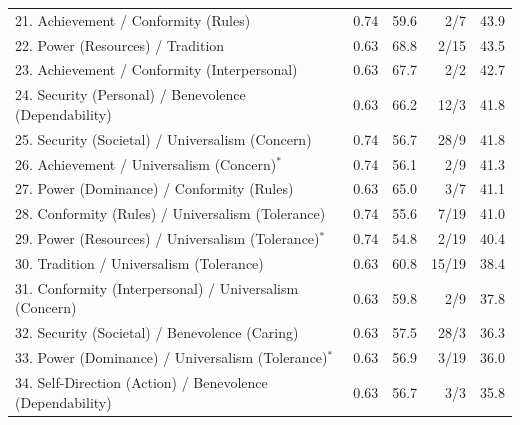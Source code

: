 {\begin{tabular}{p{}rrrr}
21. Achievement / Conformity (Rules) & 0.74 & 59.6 & 2/7 & 43.9 \\
22. Power (Resources) / Tradition & 0.63 & 68.8 & 2/15 & 43.5 \\
23. Achievement / Conformity (Interpersonal) & 0.63 & 67.7 & 2/2 & 42.7 \\
24. Security (Personal) / Benevolence (Dependability) & 0.63 & 66.2 & 12/3 & 41.8 \\
25. Security (Societal) / Universalism (Concern) & 0.74 & 56.7 & 28/9 & 41.8 \\
26. Achievement / Universalism (Concern)$^{*}$ & 0.74 & 56.1 & 2/9 & 41.3 \\
27. Power (Dominance) / Conformity (Rules) & 0.63 & 65.0 & 3/7 & 41.1 \\
28. Conformity (Rules) / Universalism (Tolerance) & 0.74 & 55.6 & 7/19 & 41.0 \\
29. Power (Resources) / Universalism (Tolerance)$^{*}$ & 0.74 & 54.8 & 2/19 & 40.4 \\
30. Tradition / Universalism (Tolerance) & 0.63 & 60.8 & 15/19 & 38.4 \\
31. Conformity (Interpersonal) / Universalism (Concern) & 0.63 & 59.8 & 2/9 & 37.8 \\
32. Security (Societal) / Benevolence (Caring) & 0.63 & 57.5 & 28/3 & 36.3 \\
33. Power (Dominance) / Universalism (Tolerance)$^{*}$ & 0.63 & 56.9 & 3/19 & 36.0 \\
34. Self-Direction (Action) / Benevolence (Dependability) & 0.63 & 56.7 & 3/3 & 35.8 \\
\bottomrule
\end{tabular}
}%